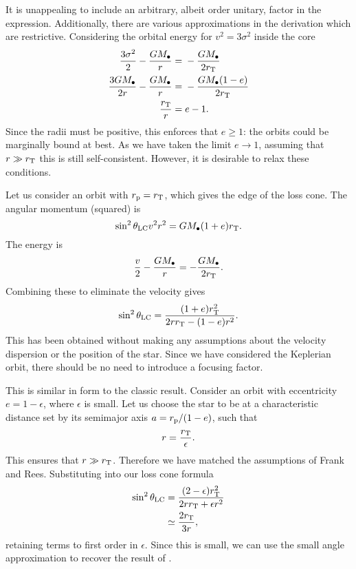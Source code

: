 It is unappealing to include an arbitrary, albeit order unitary, factor in the expression. Additionally, there are various approximations in the derivation which are restrictive. Considering the orbital energy for $v^2 = 3\sigma^2$ inside the core
\begin{align}
\frac{3\sigma^2}{2} - \frac{GM_\bullet}{r} = {} & -\frac{GM_\bullet}{2r_\mathrm{T}} \\
\frac{3GM_\bullet}{2r} - \frac{GM_\bullet}{r} = {} & -\frac{GM_\bullet(1-e)}{2r_\mathrm{T}} \\
\frac{r_\mathrm{T}}{r} = {} & e - 1.
\end{align}
Since the radii must be positive, this enforces that $e \geq 1$: the orbits could be marginally bound at best. As we have taken the limit $e \rightarrow 1$, assuming that $r \gg r_\mathrm{T}$ this is still self-consistent. However, it is desirable to relax these conditions.

Let us consider an orbit with $r_\mathrm{p} = r_\mathrm{T}$, which gives the edge of the loss cone. The angular momentum (squared) is
\begin{equation}
\sin^2\theta_\mathrm{LC}v^2r^2 = GM_\bullet(1+e)r_\mathrm{T}.
\end{equation}
The energy is
\begin{equation}
\frac{v}{2} - \frac{GM_\bullet}{r} = -\frac{GM_\bullet}{2r_\mathrm{T}}.
\end{equation}
Combining these to eliminate the velocity gives
\begin{equation}
\sin^2\theta_\mathrm{LC} = \frac{(1+e)r_\mathrm{T}^2}{2rr_\mathrm{T} - (1-e)r^2}.
\end{equation}
This has been obtained without making any assumptions about the velocity dispersion or the position of the star. Since we have considered the Keplerian orbit, there should be no need to introduce a focusing factor.

This is similar in form to the classic result. Consider an orbit with eccentricity $e = 1 - \epsilon$, where $\epsilon$ is small. Let us choose the star to be at a characteristic distance set by its semimajor axis $a = r_\mathrm{p}/(1 - e)$, such that
\begin{equation}
r = \frac{r_\mathrm{T}}{\epsilon}.
\end{equation}
This ensures that $r \gg r_\mathrm{T}$. Therefore we have matched the assumptions of Frank and Rees. Substituting into our loss cone formula
\begin{align}
\sin^2\theta_\mathrm{LC} = {} & \frac{(2 - \epsilon)r_\mathrm{T}^2}{2rr_\mathrm{T} + \epsilon r^2} \nonumber \\
 \simeq {} & \frac{2r_\mathrm{T}}{3r},
\end{align}
retaining terms to first order in $\epsilon$. Since this is small, we can use the small angle approximation to recover the result of .
